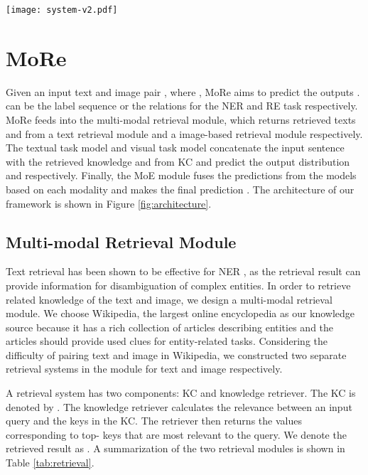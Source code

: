 \documentclass[11pt]{article}
\begin{document}
\begin{figure*}[t!]
	\centering
	\texttt{[image: system-v2.pdf]}
	\caption{The architecture of MoRe.}
	\label{fig:architecture}
\end{figure*}


\section{MoRe}
Given an input text and image pair , where , MoRe aims to predict the outputs .  can be the label sequence or the relations for the NER and RE task respectively. MoRe feeds  into the multi-modal retrieval module, which returns retrieved texts  and  from a text retrieval module and a image-based retrieval module respectively. The textual task model and visual task model concatenate the input sentence  with the retrieved knowledge  and  from KC 
and predict the output distribution  and  respectively. Finally, the MoE module fuses the predictions from the models based on each modality and makes the final prediction . The architecture of our framework is shown in Figure \ref{fig:architecture}. 

\subsection{Multi-modal Retrieval Module}
\label{sec:retr}

Text retrieval has been shown to be effective for NER \cite{wang-etal-2021-improving}, as the retrieval result can provide information for disambiguation of complex entities. In order to retrieve related knowledge of the text and image, we design a multi-modal retrieval module. 
We choose Wikipedia, the largest online encyclopedia as our knowledge source because it has a rich collection of articles describing entities and the articles should provide used clues for entity-related tasks. Considering the difficulty of pairing text and image in Wikipedia, we constructed two separate retrieval systems in the module for text and image respectively. 

A retrieval system has two components: KC and knowledge retriever. The KC is denoted by . The knowledge retriever calculates the relevance between an input query  and the keys in the KC. The retriever then returns the values corresponding to top- keys that are most relevant to the query. We denote the retrieved result as . A summarization of the two retrieval modules is shown in Table \ref{tab:retrieval}.
\end{document}
